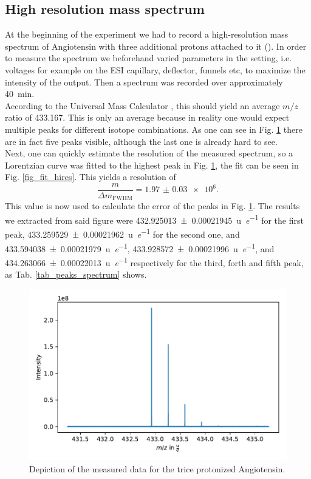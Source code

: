 \documentclass[a4paper,10pt]{article}
\begin{document}
\subsection{High resolution mass spectrum}
At the beginning of the experiment we had to record a high-resolution mass spectrum of Angiotensin with three additional protons attached to it (). In order to measure the spectrum we beforehand varied parameters in the setting, i.e. voltages for example on the ESI capillary, deflector, funnels etc, to maximize the intensity of the output. 
Then a spectrum was recorded over approximately \SI{40}{\minute}.\\
According to the Universal Mass Calculator \cite{umc}, this should yield an average $m/z$ ratio of \num{433.167}. This is only an average because in reality one would expect multiple peaks for different isotope combinations. As one can see in Fig. \ref{fig_hres_spectroscopy} there are in fact five peaks visible, although the last one is already hard to see. \\
Next, one can quickly estimate the resolution of the measured spectrum, so a Lorentzian curve was fitted to the highest peak in Fig. \ref{fig_hres_spectroscopy}, the fit can be seen in Fig. \ref{fig_fit_hires}. This yields a resolution of 
\begin{equation}
	\frac{m}{\Delta m_\mathrm{FWHM}} = \num{1.97(3) e6}.
\end{equation}
This value is now used to calculate the error of the peaks in Fig. \ref{fig_hres_spectroscopy}. The results we extracted from said figure were \SI{432.925013 \pm 0.00021945}{\atomicmassunit \per \elementarycharge} for the first peak, \SI{433.259529 \pm 0.00021962}{\atomicmassunit \per \elementarycharge} for the second one, and \SI{433.594038 \pm 0.00021979}{\atomicmassunit \per \elementarycharge}, \SI{433.928572 \pm 0.00021996}{\atomicmassunit \per \elementarycharge}, and \SI{434.263066 \pm 0.00022013}{\atomicmassunit \per \elementarycharge} respectively for the third, forth and fifth peak, as Tab. \ref{tab_peaks_spectrum} shows. 

\begin{figure}[H]
	\centering
	\includegraphics[width = 0.8 \textwidth]{hires_spectrum.pdf}
	\caption{Depiction of the measured data for the trice protonized Angiotensin. }
	\label{fig_hres_spectroscopy}
\end{figure}
\end{document}
